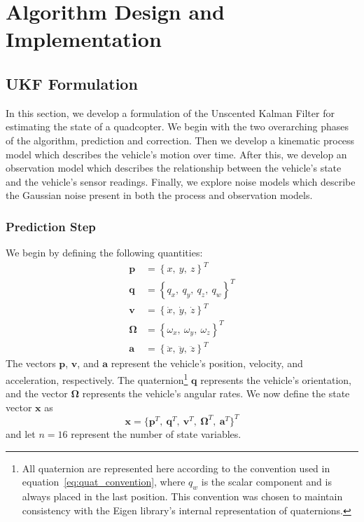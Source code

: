 \chapter{Algorithm Design and Implementation} \label{ch:Alg_Design}

\section{UKF Formulation} \label{sec:ukf_formulation}

In this section, we develop a formulation of the Unscented Kalman Filter for estimating the state of a quadcopter. We begin with the two overarching phases of the algorithm, prediction and correction. Then we develop a kinematic process model which describes the vehicle's motion over time. After this, we develop an observation model which describes the relationship between the vehicle's state and the vehicle's sensor readings. Finally, we explore noise models which describe the Gaussian noise present in both the process and observation models.

\subsection{Prediction Step}

We begin by defining the following quantities:
%
\begin{align} \label{eq:state_vars}
\mathbf{p} &= \left\lbrace x,\ y,\ z \right\rbrace ^{T} \\
\mathbf{q} &= \left\lbrace q_{x},\ q_{y},\ q_{z},\ q_{w} \right\rbrace ^{T} \label{eq:quat_convention} \\
\mathbf{v} &= \left\lbrace \dot{x},\ \dot{y},\ \dot{z} \right\rbrace ^{T} \\
\bm{\Omega} &= \left\lbrace \omega_{x},\ \omega_{y},\ \omega_{z} \right\rbrace ^{T} \\
\mathbf{a} &= \left\lbrace \ddot{x},\ \ddot{y},\ \ddot{z} \right\rbrace ^{T}
\end{align}
%
The vectors $\mathbf{p}$, $\mathbf{v}$, and $\mathbf{a}$ represent the vehicle's position, velocity, and acceleration, respectively. The quaternion\footnote{All quaternion are represented here according to the convention used in equation~\ref{eq:quat_convention}, where $q_{w}$ is the scalar component and is always placed in the last position. This convention was chosen to maintain consistency with the Eigen library's internal representation of quaternions.} $\mathbf{q}$ represents the vehicle's orientation, and the vector $\bm{\Omega}$ represents the vehicle's angular rates. We now define the state vector $\mathbf{x}$ as
%
\begin{equation}
\mathbf{x} = 
\Big\{
    \mathbf{p}^{T},\
    \mathbf{q}^{T},\
    \mathbf{v}^{T},\
    \bm{\Omega}^{T},\
    \mathbf{a}^{T}
\Big\} ^{T}
\end{equation}
%
and let $n = 16$ represent the number of state variables.

